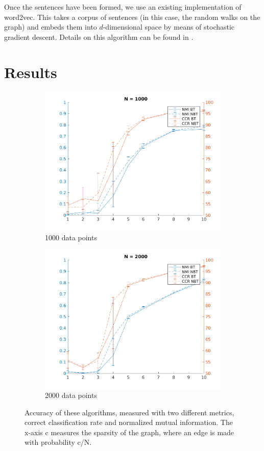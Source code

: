 \documentclass{article}
\begin{document}
Once the sentences have been formed, we use an existing implementation of word2vec\cite{word2vec}. This takes a corpus of sentences (in this case, the random walks on the graph) and embeds them into $d$-dimensional space by means of stochastic gradient descent. Details on this algorithm can be found in \cite{word2vec}.

\section{Results}

\begin{figure}[ht]
 
\begin{subfigure}{0.5\textwidth}
\includegraphics[width=.95\linewidth]{N1000variedc} 
\caption{1000 data points}
\label{fig:subim1}
\end{subfigure}
\begin{subfigure}{0.5\textwidth}
\includegraphics[width=.95\linewidth]{N2000variedc}
\caption{2000 data points}
\label{fig:subim2}
\end{subfigure}
\caption{Accuracy of these algorithms, measured with two different metrics, correct classification rate and normalized mutual information. The x-axis c measures the sparsity of the graph, where an edge is made with probability c/N.}
\label{fig:image2}
\end{figure}

\printbibliography
\end{document}
